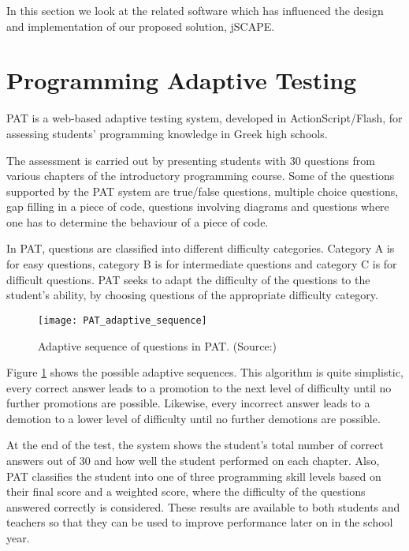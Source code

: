 In this section we look at the related software which has influenced the design and implementation of our proposed solution, jSCAPE.

\section{Programming Adaptive Testing}
\label{sec:PAT}
PAT\cite{PAT} is a web-based adaptive testing system, developed in ActionScript/Flash, for assessing students' programming knowledge in Greek high schools. \newline

The assessment is carried out by presenting students with 30 questions from various chapters of the introductory programming course. Some of the questions supported by the PAT system are true/false questions, multiple choice questions, gap filling in a piece of code, questions involving diagrams and questions where one has to determine the behaviour of a piece of code.\newline

In PAT, questions are classified into different difficulty categories. Category A is for easy questions, category B is for intermediate questions and category C is for difficult questions. PAT seeks to adapt the difficulty of the questions to the student's ability, by choosing questions of the appropriate difficulty category.

\begin{figure}[H]
\centering
\texttt{[image: PAT\_adaptive\_sequence]}
\caption{Adaptive sequence of questions in PAT. (Source:\cite{PAT})}
\label{fig:PAT_adaptive_sequence}
\end{figure}

Figure \ref{fig:PAT_adaptive_sequence} shows the possible adaptive sequences. This algorithm is quite simplistic, every correct answer leads to a promotion to the next level of difficulty until no further promotions are possible. Likewise, every incorrect answer leads to a demotion to a lower level of difficulty until no further demotions are possible.\newline

At the end of the test, the system shows the student's total number of correct answers out of 30 and how well the student performed on each chapter. Also, PAT classifies the student into one of three programming skill levels based on their final score and a weighted score, where the difficulty of the questions answered correctly is considered. These results are available to both students and teachers so that they can be used to improve performance later on in the school year.\newline

